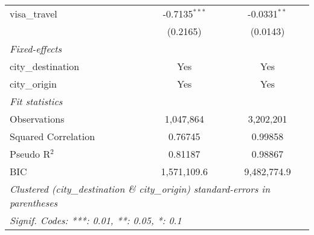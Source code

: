 \begin{tabular}{lcc}
   visa\_travel                      & -0.7135$^{***}$   & -0.0331$^{**}$\\   
                                     & (0.2165)          & (0.0143)\\   
   \midrule
   \emph{Fixed-effects}\\
   city\_destination                 & Yes               & Yes\\  
   city\_origin                      & Yes               & Yes\\  
   \midrule
   \emph{Fit statistics}\\
   Observations                      & 1,047,864         & 3,202,201\\  
   Squared Correlation               & 0.76745           & 0.99858\\  
   Pseudo R$^2$                      & 0.81187           & 0.98867\\  
   BIC                               & 1,571,109.6       & 9,482,774.9\\  
   \midrule \midrule
   \multicolumn{3}{l}{\emph{Clustered (city\_destination \& city\_origin) standard-errors in parentheses}}\\
   \multicolumn{3}{l}{\emph{Signif. Codes: ***: 0.01, **: 0.05, *: 0.1}}\\
\end{tabular}
\par\endgroup



